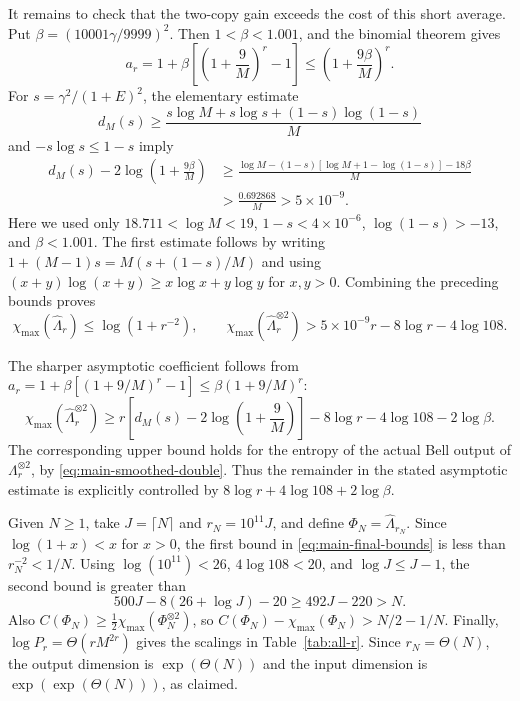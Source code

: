 It remains to check that the two-copy gain exceeds the cost of this
short average. Put $\beta=(10001\gamma/9999)^2$. Then
$1<\beta<1.001$, and the binomial theorem gives
\[
 a_r=1+\beta\left[\left(1+\frac9M\right)^r-1\right]
 \le\left(1+\frac{9\beta}{M}\right)^r.
\]
For $s=\gamma^2/(1+E)^2$, the elementary estimate
\[
 d_M(s)\ge\frac{s\log M+s\log s+(1-s)\log(1-s)}{M}
\]
and $-s\log s\le1-s$ imply
\begin{align*}
 d_M(s)-2\log\left(1+\frac{9\beta}{M}\right)
 &\ge\frac{\log M-(1-s)[\log M+1-\log(1-s)]-18\beta}{M}\\
 &>\frac{0.692868}{M}>5\times10^{-9}.
\end{align*}
Here we used only $18.711<\log M<19$,
$1-s<4\times10^{-6}$, $\log(1-s)>-13$, and $\beta<1.001$.
The first estimate follows by writing $1+(M-1)s=M(s+(1-s)/M)$
and using $(x+y)\log(x+y)\ge x\log x+y\log y$ for $x,y>0$.
Combining the preceding bounds proves
\begin{equation}\label{eq:main-final-bounds}
 \chi_{\max}(\widehat\Lambda_r)\le\log(1+r^{-2}),\qquad
 \chi_{\max}(\widehat\Lambda_r^{\otimes2})
 >5\times10^{-9}r-8\log r-4\log108.
\end{equation}

The sharper asymptotic coefficient follows from
$a_r=1+\beta[(1+9/M)^r-1]\le\beta(1+9/M)^r$:
\begin{equation}\label{eq:main-sharp-holevo}
 \chi_{\max}(\widehat\Lambda_r^{\otimes2})
 \ge r\left[d_M(s)-2\log\left(1+\frac9M\right)\right]
       -8\log r-4\log108-2\log\beta.
\end{equation}
The corresponding upper bound holds for the entropy of the actual Bell
output of $\Lambda_r^{\otimes2}$, by \eqref{eq:main-smoothed-double}.
Thus the remainder in the stated asymptotic estimate is explicitly
controlled by $8\log r+4\log108+2\log\beta$.

Given $N\ge1$, take $J=\lceil N\rceil$ and $r_N=10^{11}J$, and define
$\Phi_N=\widehat\Lambda_{r_N}$. Since $\log(1+x)<x$ for $x>0$, the first bound in
\eqref{eq:main-final-bounds} is less than $r_N^{-2}<1/N$.
Using $\log(10^{11})<26$, $4\log108<20$, and $\log J\le J-1$,
the second bound is greater than
\[
 500J-8(26+\log J)-20\ge492J-220>N.
\]
Also $C(\Phi_N)\ge\tfrac12\chi_{\max}(\Phi_N^{\otimes2})$, so
$C(\Phi_N)-\chi_{\max}(\Phi_N)>N/2-1/N$.
Finally, $\log P_r=\Theta(rM^{2r})$ gives the scalings in
Table~\ref{tab:all-r}. Since $r_N=\Theta(N)$, the output dimension
is $\exp(\Theta(N))$ and the input dimension is
$\exp(\exp(\Theta(N)))$, as claimed.
